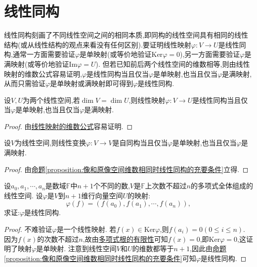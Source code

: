 \documentclass[../../main.tex]{subfiles}
\begin{document}
\section{线性同构}
线性同构刻画了不同线性空间之间的相同本质,即同构的线性空间具有相同的线性结构(或从线性结构的观点来看没有任何区别).要证明线性映射\(\varphi:V\to U\)是线性同构,通常一方面需要验证\(\varphi\)是单映射(或等价地验证\(\text{Ker}\varphi = 0\)),另一方面需要验证\(\varphi\)是满映射(或等价地验证\(\text{Im}\varphi = U\)). 但若已知前后两个线性空间的维数相等,则由线性映射的维数公式容易证明,\(\varphi\)是线性同构当且仅当\(\varphi\)是单映射,也当且仅当\(\varphi\)是满映射,从而只需验证\(\varphi\)是单映射或满映射即可得到\(\varphi\)是线性同构.

\begin{proposition}\label{proposition:像和原像空间维数相同时线性同构的充要条件}
设$V,U$为两个线性空间,若\(\dim V = \dim U\),则线性映射\(\varphi:V\rightarrow U\)是线性同构当且仅当\(\varphi\)是单映射,也当且仅当\(\varphi\)是满映射.
\end{proposition}
\begin{proof}
由\hyperref[proposition:值域和核空间维数之和等于原像空间维数]{线性映射的维数公式}容易证明.
\end{proof}

\begin{corollary}\label{corollary:线性变换自同构的充要条件}
设$V$为线性空间,则线性变换\(\varphi:V\rightarrow V\)是自同构当且仅当\(\varphi\)是单映射,也当且仅当\(\varphi\)是满映射.
\end{corollary}
\begin{proof}
由\hyperref[proposition:像和原像空间维数相同时线性同构的充要条件]{命题\ref{proposition:像和原像空间维数相同时线性同构的充要条件}}立得.
\end{proof}

\begin{lemma}\label{lemma:证明Lagrange插值公式}
设\(a_0,a_1,\cdots,a_n\)是数域\(\mathbb{F}\)中\(n + 1\)个不同的数,\(V\)是\(\mathbb{F}\)上次数不超过\(n\)的多项式全体组成的线性空间. 设\(\varphi\)是\(V\)到\(n + 1\)维行向量空间\(U\)的映射:
\[
\varphi(f)=(f(a_0),f(a_1),\cdots,f(a_n)),
\]
求证:\(\varphi\)是线性同构.
\end{lemma}
\begin{proof}
不难验证\(\varphi\)是一个线性映射. 若\(f(x)\in\text{Ker}\varphi\),则\(f(a_i)=0(0\leqslant  i\leqslant  n)\). 因为\(f(x)\)的次数不超过\(n\),故由\hyperref[proposition:多项式根的有限性]{多项式根的有限性}可知\(f(x)=0\),即\(\text{Ker}\varphi = 0\),这证明了映射\(\varphi\)是单映射. 注意到线性空间\(V\)和\(U\)的维数都等于\(n + 1\),因此由\hyperref[proposition:像和原像空间维数相同时线性同构的充要条件]{命题\ref{proposition:像和原像空间维数相同时线性同构的充要条件}}可知\(\varphi\)是线性同构.
\end{proof}
\end{document}
